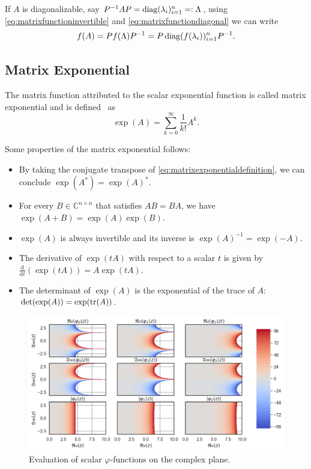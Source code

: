 If $A$ is diagonalizable, say $P^{-1}AP = \operatorname{diag}(\lambda_i)_{i=1}^{n} =: \Lambda$,
using \eqref{eq:matrixfunctioninvertible} and \eqref{eq:matrixfunctiondiagonal}
we can write
\begin{equation}
    f(A) = P f(\Lambda) P^{-1} = P \operatorname{diag}(f(\lambda_i))_{i=1}^{n} P^{-1}.
\end{equation}

\subsection{Matrix Exponential}
The matrix function attributed to the scalar exponential function is called
matrix exponential and is defined~\cite{higham2008functions} as
\begin{equation}
    \label{eq:matrixexponentialdefinition}
    \exp(A) = \sum_{k=0}^{\infty}{\frac{1}{k!} A^k}.
\end{equation}

Some properties of the matrix exponential follows:
\begin{itemize}
    \item By taking the conjugate transpose of \eqref{eq:matrixexponentialdefinition},
        we can conclude $\exp(A^{*}) = \exp(A)^{*}$.
    \item For every $B \in \mathbb{C}^{n \times n}$ that satisfies $AB = BA$,
        we have $\exp(A + B) = \exp(A) \exp(B)$.
    \item $\exp(A)$ is always invertible and its inverse is $\exp(A)^{-1} = \exp(-A)$.
    \item The derivative of $\exp(tA)$ with respect to a scalar $t$ is given by
        $\frac{\mathrm{d}}{\mathrm{d} t} (\exp(tA)) = A \exp(tA)$.
    \item The determinant of $\exp(A)$ is the exponential of the trace of
        $A$: $\det(\exp(A)) = \exp(\trace(A))$.
\end{itemize}

\begin{figure}[h]
    \centering
    \includegraphics[width=.7\textwidth]{img/scalarcomplexplane.png}
    \caption{Evaluation of scalar $\varphi$-functions on the complex plane.}
    \label{fig:scalarphifunctionscomplexplane}
\end{figure}


